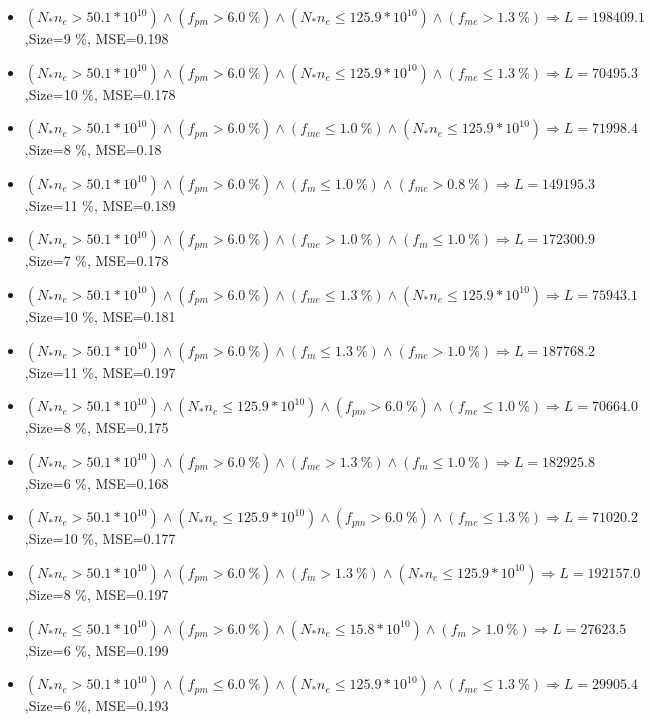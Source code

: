 \documentclass[numbered]{CSL}
\begin{document}
\begin{itemize}
\item $(N_* n_e > 50.1 * 10^{10}) \land (f_{pm} > 6.0~\%) \land (N_* n_e \leq 125.9 * 10^{10}) \land (f_{me} > 1.3~\%) \Rightarrow L = 198409.1$,\hfill Size=9 \%, MSE=0.198
\item $(N_* n_e > 50.1 * 10^{10}) \land (f_{pm} > 6.0~\%) \land (N_* n_e \leq 125.9 * 10^{10}) \land (f_{me} \leq 1.3~\%) \Rightarrow L = 70495.3$,\hfill Size=10 \%, MSE=0.178
\item $(N_* n_e > 50.1 * 10^{10}) \land (f_{pm} > 6.0~\%) \land (f_{me} \leq 1.0~\%) \land (N_* n_e \leq 125.9 * 10^{10}) \Rightarrow L = 71998.4$,\hfill Size=8 \%, MSE=0.18
\item $(N_* n_e > 50.1 * 10^{10}) \land (f_{pm} > 6.0~\%) \land (f_m \leq 1.0~\%) \land (f_{me} > 0.8~\%) \Rightarrow L = 149195.3$,\hfill Size=11 \%, MSE=0.189
\item $(N_* n_e > 50.1 * 10^{10}) \land (f_{pm} > 6.0~\%) \land (f_{me} > 1.0~\%) \land (f_m \leq 1.0~\%) \Rightarrow L = 172300.9$,\hfill Size=7 \%, MSE=0.178
\item $(N_* n_e > 50.1 * 10^{10}) \land (f_{pm} > 6.0~\%) \land (f_{me} \leq 1.3~\%) \land (N_* n_e \leq 125.9 * 10^{10}) \Rightarrow L = 75943.1$,\hfill Size=10 \%, MSE=0.181
\item $(N_* n_e > 50.1 * 10^{10}) \land (f_{pm} > 6.0~\%) \land (f_m \leq 1.3~\%) \land (f_{me} > 1.0~\%) \Rightarrow L = 187768.2$,\hfill Size=11 \%, MSE=0.197
\item $(N_* n_e > 50.1 * 10^{10}) \land (N_* n_e \leq 125.9 * 10^{10}) \land (f_{pm} > 6.0~\%) \land (f_{me} \leq 1.0~\%) \Rightarrow L = 70664.0$,\hfill Size=8 \%, MSE=0.175
\item $(N_* n_e > 50.1 * 10^{10}) \land (f_{pm} > 6.0~\%) \land (f_{me} > 1.3~\%) \land (f_m \leq 1.0~\%) \Rightarrow L = 182925.8$,\hfill Size=6 \%, MSE=0.168
\item $(N_* n_e > 50.1 * 10^{10}) \land (N_* n_e \leq 125.9 * 10^{10}) \land (f_{pm} > 6.0~\%) \land (f_{me} \leq 1.3~\%) \Rightarrow L = 71020.2$,\hfill Size=10 \%, MSE=0.177
\item $(N_* n_e > 50.1 * 10^{10}) \land (f_{pm} > 6.0~\%) \land (f_m > 1.3~\%) \land (N_* n_e \leq 125.9 * 10^{10}) \Rightarrow L = 192157.0$,\hfill Size=8 \%, MSE=0.197
\item $(N_* n_e \leq 50.1 * 10^{10}) \land (f_{pm} > 6.0~\%) \land (N_* n_e \leq 15.8 * 10^{10}) \land (f_m > 1.0~\%) \Rightarrow L = 27623.5$,\hfill Size=6 \%, MSE=0.199
\item $(N_* n_e > 50.1 * 10^{10}) \land (f_{pm} \leq 6.0~\%) \land (N_* n_e \leq 125.9 * 10^{10}) \land (f_{me} \leq 1.3~\%) \Rightarrow L = 29905.4$,\hfill Size=6 \%, MSE=0.193

\end{itemize}
\end{document}
